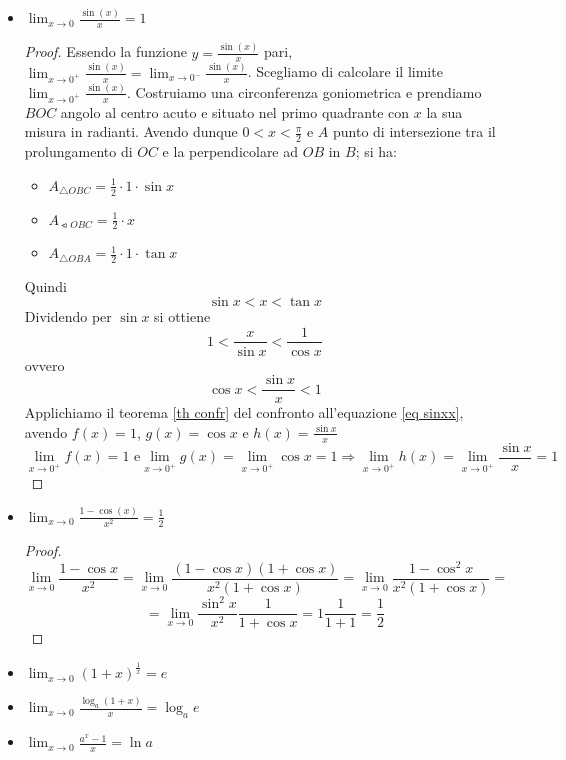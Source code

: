 \documentclass[]{report}
\theoremstyle{definition}
\theoremstyle{remark}
\theoremstyle{plain}
\numberwithin{equation}{chapter}
\begin{document}
\begin{itemize}
	\item $\displaystyle \lim_{x \to 0} \frac{\sin(x)}{x} = 1$
	\begin{proof}
	Essendo la funzione $y=\frac{\sin(x)}{x}$ pari, $\lim_{x \to 0^+} \frac{\sin(x)}{x}=\lim_{x \to 0^-} \frac{\sin(x)}{x}$. Scegliamo di calcolare il limite $\lim_{x \to 0^+} \frac{\sin(x)}{x}$.
	Costruiamo una circonferenza goniometrica e prendiamo $BOC$ angolo al centro acuto e situato nel primo quadrante con $x$ la sua misura in radianti. Avendo dunque $0<x<\frac{\pi}{2}$ e $A$ punto di intersezione tra il prolungamento di $OC$ e la perpendicolare ad $OB$ in $B$; si ha:
	\begin{itemize}
		\item $A_{\triangle OBC}=\frac{1}{2} \cdot 1 \cdot \sin x$
		\item $A_{\leftslice OBC}=\frac{1}{2} \cdot x$
		\item $A_{\triangle OBA}=\frac{1}{2} \cdot 1 \cdot \tan x$
	\end{itemize}
	Quindi
	$$\sin x<x<\tan x$$
	Dividendo per $\sin x$ si ottiene
	$$1<\frac{x}{\sin x}<\frac{1}{\cos x}$$
	ovvero
	\begin{equation}\label{eq sinxx}
		\cos x<\frac{\sin x}{x}< 1
	\end{equation}
	Applichiamo il teorema \ref{th confr} del confronto all'equazione \eqref{eq 
	sinxx}, avendo $f(x)=1$, $g(x)=\cos x$ e $h(x)=\frac{\sin x}{x}$ 
	$$\lim_{x \to 0^+} f(x)=1 \textrm{ e} \lim_{x \to 0^+} g(x)=\lim_{x \to 0^+} \cos x=1 \Rightarrow \lim_{x \to 0^+} h(x)=\lim_{x \to 0^+} \frac{\sin x}{x}=1$$

	\end{proof}
	\item $\displaystyle \lim_{x \to 0} \frac{1 - \cos(x)}{x^2} = \frac{1}{2}$
	\begin{proof}
		$$\lim_{x \to 0} \frac{1 - \cos x}{x^2} = \lim_{x \to 0} \frac{(1 - \cos x)(1 + \cos x)}{x^2(1 + \cos x)}= \lim_{x \to 0} \frac{1-\cos^2 x}{x^2(1 + \cos x)}=$$
		$$=\lim_{x \to 0}\frac{\sin^2 x}{x^2}\frac{1}{1+\cos x}=1 \frac{1}{1+1}=\frac{1}{2}$$
	\end{proof}
	\item $\displaystyle \lim_{x \to 0} (1+x)^{\frac{1}{x}} = \mathit{e}$
	\item $\displaystyle \lim_{x \to 0} \frac{\log_{a}(1+x)}{x} = \log_{a}\mathit{e}$
	\item $\displaystyle \lim_{x \to 0} \frac{a^x-1}{x} = \ln a$
\end{itemize}
\end{document}
